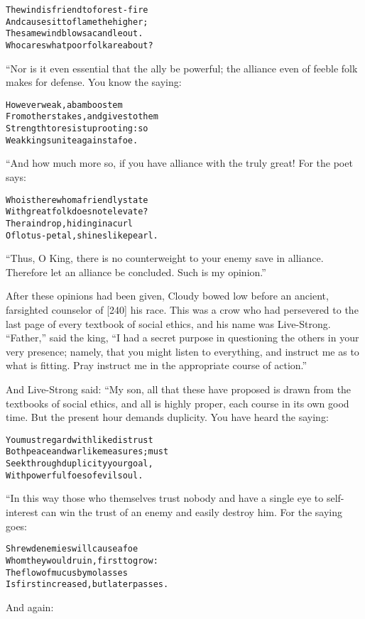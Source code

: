 \documentclass{article}
\renewenvironment{verbatim}{\begin{alltt}\normalfont\begin{centering}}{\end{centering}\end{alltt}}
\begin{document}
\begin{verbatim}
The wind is friend to forest-fire
And causes it to flame the higher;
The same wind blows a candle out.
Who cares what poor folk are about?
\end{verbatim}
“Nor is it even essential that the ally be powerful; the alliance
even of feeble folk makes for defense. You know the saying:

\begin{verbatim}
However weak, a bamboo stem
From others takes, and gives to them
Strength to resist uprooting: so
Weak kings unite against a foe.
\end{verbatim}
“And how much more so, if you have alliance with the truly great!
For the poet says:

\begin{verbatim}
Who is there whom a friendly state
With great folk does not elevate?
The raindrop, hiding in a curl
Of lotus-petal, shines like pearl.
\end{verbatim}
``Thus, O King, there is no counterweight to your enemy save in alliance. Therefore let an alliance be concluded. Such is my opinion.''

After these opinions had been given, Cloudy bowed low before an
ancient, farsighted counselor of [240] his race. This was a crow
who had persevered to the last page of every textbook of social
ethics, and his name was Live-Strong. ``Father,'' said the king,
``I had a secret purpose in questioning the others in your very presence; namely, that you might listen to everything, and instruct me as to what is fitting. Pray instruct me in the appropriate course of action.''

And Live-Strong said: “My son, all that these have proposed is
drawn from the textbooks of social ethics, and all is highly
proper, each course in its own good time. But the present hour
demands duplicity. You have heard the saying:

\begin{verbatim}
You must regard with like distrust
Both peace and warlike measures; must
Seek through duplicity your goal,
With powerful foes of evil soul.
\end{verbatim}
“In this way those who themselves trust nobody and have a single
eye to self-interest can win the trust of an enemy and easily
destroy him. For the saying goes:

\begin{verbatim}
Shrewd enemies will cause a foe
Whom they would ruin, first to grow:
The flow of mucus by molasses
Is first increased, but later passes.
\end{verbatim}
And again:
\end{document}
